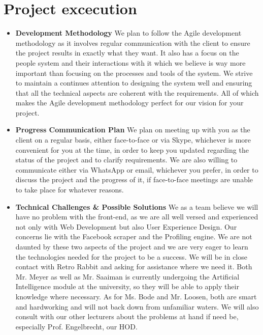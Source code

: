 \documentclass{article}
\begin{document}
	\section{Project excecution}
	\begin{itemize}
		\item \textbf{Development Methodology} \newline \newline
		We plan to follow the Agile development methodology as it involves regular communication with the client to ensure the project results in exactly what they want. It also has a focus on the people system and their interactions with it which we believe is way more important than focusing on the processes and tools of the system. We strive to maintain a continues attention to designing the system well and ensuring that all the technical aspects are coherent with the requirements. All of which makes the Agile development methodology perfect for our vision for your project.
		
		\item \textbf{Progress Communication Plan} \newline \newline
		We plan on meeting up with you as the client on a regular basis, either face-to-face or via Skype, whichever is more convenient for you at the time, in order to keep you updated regarding the status of the project and to clarify requirements. We are also willing to communicate either via WhatsApp or email, whichever you prefer, in order to discuss the project and the progress of it, if face-to-face meetings are unable to take place for whatever reasons.

		\item \textbf{Technical Challenges \& Possible Solutions} \newline \newline
		We as a team believe we will have no problem with the front-end, as we are all well versed and experienced not only with Web Development but also User Experience Design. Our concerns lie with the Facebook scraper and the Profiling engine. We are not daunted by these two aspects of the project and we are very eager to learn the technologies needed for the project to be a success. We will be in close contact with Retro Rabbit and asking for assistance where we need it. Both Mr. Meyer as well as Mr. Saaiman is currently undergoing the Artificial Intelligence module at the university, so they will be able to apply their knowledge where necessary. As for Ms. Bode and Mr. Loosen, both are smart and hardworking and will not back down from unfamiliar waters. We will also consult with our other lecturers about the problems at hand if need be, especially Prof. Engelbrecht, our HOD.


\end{itemize}
\end{document}
